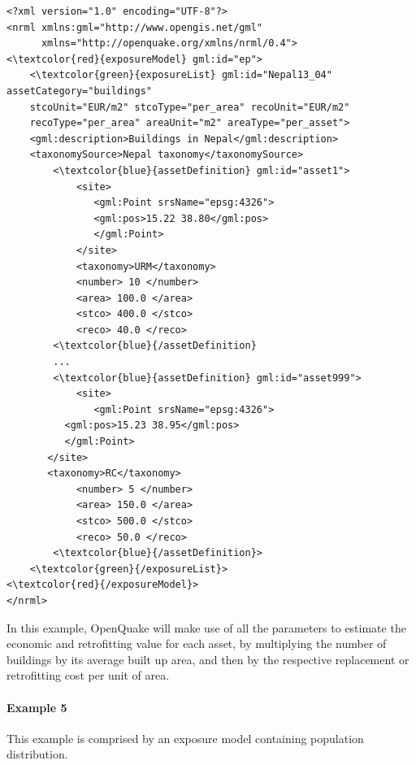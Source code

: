\begin{Verbatim}[frame=single, commandchars=\\\{\}, samepage=false]
<?xml version="1.0" encoding="UTF-8"?>
<nrml xmlns:gml="http://www.opengis.net/gml"
      xmlns="http://openquake.org/xmlns/nrml/0.4">
<\textcolor{red}{exposureModel} gml:id="ep">
    <\textcolor{green}{exposureList} gml:id="Nepal13_04" assetCategory="buildings" 
    stcoUnit="EUR/m2" stcoType="per_area" recoUnit="EUR/m2" 
    recoType="per_area" areaUnit="m2" areaType="per_asset">
    <gml:description>Buildings in Nepal</gml:description>
    <taxonomySource>Nepal taxonomy</taxonomySource>
        <\textcolor{blue}{assetDefinition} gml:id="asset1">
            <site>
               <gml:Point srsName="epsg:4326">
               <gml:pos>15.22 38.80</gml:pos>
               </gml:Point>
            </site>
            <taxonomy>URM</taxonomy>
            <number> 10 </number>
            <area> 100.0 </area>
            <stco> 400.0 </stco>
            <reco> 40.0 </reco>
        <\textcolor{blue}{/assetDefinition} 
        ...
        <\textcolor{blue}{assetDefinition} gml:id="asset999">
            <site>
               <gml:Point srsName="epsg:4326">
	      <gml:pos>15.23 38.95</gml:pos>
	      </gml:Point>
	   </site>
	   <taxonomy>RC</taxonomy>
            <number> 5 </number>
            <area> 150.0 </area>
            <stco> 500.0 </stco>
            <reco> 50.0 </reco>
        <\textcolor{blue}{/assetDefinition}> 
    <\textcolor{green}{/exposureList}>
<\textcolor{red}{/exposureModel}>
</nrml>
\end{Verbatim}

In this example, OpenQuake will make use of all the parameters to estimate the economic and retrofitting value for each asset, by multiplying the number of buildings by its average built up area, and then by the respective replacement or retrofitting cost per unit of area. 

\paragraph{Example 5}
This example is comprised by an exposure model containing population distribution.

